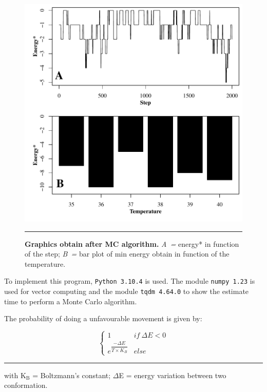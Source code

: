\documentclass[12pt, oneside, a4paper]{report}
\newcommand{\eqdes}[1]{
    \begin{footnotesize}
        \hrule height 1pt
        #1
    \end{footnotesize}
}
\newcommand{\id}[1]{$_\text{#1}$}
\begin{document}
\begin{multicols}{2}
\begin{figure}[!b!t]
    \includegraphics[width=\textwidth]{figure/energy.pdf}
    
    \small
    \vspace{0.5ex}
    \hrule height 1pt

    \caption{
        \textbf{Graphics obtain after MC algorithm.} \textit{A~=} energy* in function of the step; \textit{B~=} bar plot of min energy obtain in function of the temperature.
        \label{f:energy}}
\end{figure}

To implement this program, \texttt{Python 3.10.4} is used. The module \texttt{numpy 1.23} is used for vector computing and the module \texttt{tqdm 4.64.0} to show the estimate time to perform a Monte Carlo algorithm.

The probability of doing a unfavourable movement is given by:

\vspace{-2ex}

\begin{equation*}
    \left\lbrace
    \begin{array}{ll}
        1                                       & if\:\Delta{} E < 0 \\
        e^{\dfrac{-\Delta{}E}{T \times K_B}}    & else
    \end{array}
    \right.
\end{equation*}
\eqdes{with K\id{B} = Boltzmann's constant; $\Delta{}$E = energy variation between two conformation.}


\end{multicols}
\end{document}
